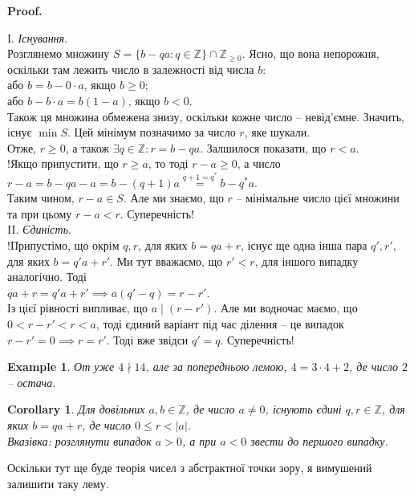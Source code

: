 \documentclass[a4paper, 14pt]{extarticle}
\makeatletter
\theoremstyle{theoremdd}
\theoremstyle{theoremdd}
\theoremstyle{theoremdd}
\theoremstyle{theoremdd}
\newtheorem{example}[theorem]{Example}
\theoremstyle{theoremdd}
\theoremstyle{theoremdd}
\theoremstyle{theoremdd}
\theoremstyle{theoremdd}
\newtheorem{corollary}[theorem]{Corollary}
\def\qed{$\blacksquare$}
\renewenvironment{proof}[1][Proof.\\]{\par
\pushQED{\hfill \qed}%
\normalfont \topsep6\p@\@plus6\p@\relax
\trivlist
\item\relax
{\bfseries
#1\@addpunct{.}}\hspace\labelsep\ignorespaces
}{%
\popQED\endtrivlist\@endpefalse
}
\makeatother
\begin{document}
\begin{proof}
I. \textit{Існування}.\\
Розглянемо множину $S = \{b - qa : q \in \mathbb{Z}\} \cap \mathbb{Z}_{\geq 0}$. Ясно, що вона непорожня, оскільки там лежить число в залежності від числа $b$:\\
або $b = b - 0 \cdot a$, якщо $b \geq 0$;\\
або $b-b \cdot a = b(1-a)$, якщо $b < 0$.\\
Також ця множина обмежена знизу, оскільки кожне число -- невід'ємне. Значить, існує $\min S$. Цей мінімум позначимо за число $r$, яке шукали.\\
Отже, $r \geq 0$, а також $\exists q \in \mathbb{Z}: r = b -qa$. Залшилося показати, що $r < a$.\\
!Якщо припустити, що $r \geq a$, то тоді $r - a \geq 0$, а число \\ $r - a = b-qa - a = b - (q+1)a \overset{q+1 = q^*}{=} b-q^*a$. \\
Таким чином, $r-a \in S$. Але ми знаємо, що $r$ -- мінімальне число цієї множини та при цьому $r - a < r$. Суперечність!
\bigskip \\
II. \textit{Єдиність}.\\
!Припустімо, що окрім $q,r$, для яких $b = qa + r$, існує ще одна інша пара $q',r'$, для яких $b = q'a + r'$. Ми тут вважаємо, що $r' < r$, для іншого випадку аналогічно. Тоді\\
$qa + r = q'a + r' \implies a(q'-q) = r - r'$. \\
Із цієї рівності випливає, що $a \mid (r-r')$. Але ми водночас маємо, що $0 < r - r' < r < a$, тоді єдиний варіант під час ділення -- це випадок $r-r' = 0 \implies r = r'$. Тоді вже звідси $q' = q$. Суперечність!
\end{proof}

\begin{example}
От уже $4 \nmid 14$, але за попередньою лемою, $4 = 3 \cdot 4 + 2$, де число $2$ -- остача.
\end{example}

\begin{corollary}
Для довільних $a,b \in \mathbb{Z}$, де число $a \neq 0$, існують єдині $q,r \in \mathbb{Z}$, для яких $b = qa+r$, де число $0 \leq r < |a|$.\\
\textit{Вказівка: розглянути випадок $a >0$, а при $a < 0$ звести до першого випадку.}
\end{corollary}

Оскільки тут ще буде теорія чисел з абстрактної точки зору, я вимушений залишити таку лему.
\end{document}

